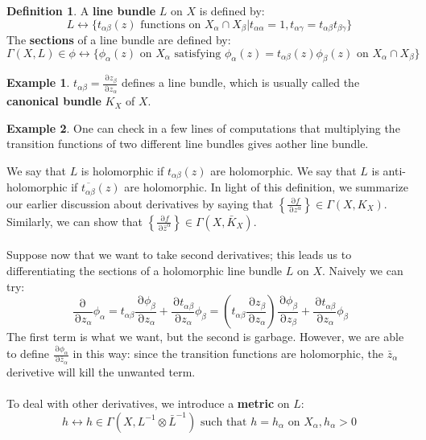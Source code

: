 \documentclass[12 pt]{article}
\DeclareMathOperator {\p} {\partial}
\theoremstyle{plain}
\theoremstyle{definition}
\newtheorem{defn}{Definition}
\newtheorem{exmp}{Example}
\theoremstyle{remark}
\begin{document}
\begin{defn}
A \textbf{line bundle} $L$ on $X$ is defined by:
\[     L \longleftrightarrow  \{ t_{\alpha \beta} (z)   \text{ functions on } X_{\alpha} \cap X_{\beta} | t_{\alpha \alpha} = 1 , t_{\alpha \gamma} = t_{\alpha \beta} t_{\beta \gamma} \}     \]
The \textbf{sections} of a line bundle are defined by:
\[  \Gamma(X,L) \in \phi \longleftrightarrow \{ \phi_{\alpha}(z) \text{ on } X_{\alpha} \text{ satisfying } \phi_{\alpha}(z) = t_{\alpha \beta}(z) \phi_{\beta}(z) \text{ on } X_{\alpha} \cap X_{\beta}  \}    \]
\end{defn}
\begin{exmp}
$t_{\alpha \beta} = \frac{\p z_{\beta}}{\p z_{\alpha}}$ defines a line bundle, which is usually called the \textbf{canonical bundle} $K_X$ of $X$.
\end{exmp}
\begin{exmp}
One can check in a few lines of computations that multiplying the transition functions of two different line bundles gives aother line bundle.
\end{exmp}
We say that $L$ is holomorphic if $t_{\alpha \beta} (z)$ are holomorphic. We say that $L$ is anti-holomorphic if $\overline{t_{\alpha \beta}} (z)$ are holomorphic. In light of this definition, we summarize our earlier discussion about derivatives by saying that $\left\{ \frac{\p f}{\p z^{\alpha}}  \right\} \in \Gamma(X, K_X)$. Similarly, we can show that $\left\{ \frac{\p f}{\p \bar z^{\alpha}}  \right\} \in \Gamma(X, \bar K_X)$.
\\
\\
Suppose now that we want to take second derivatives; this leads us to differentiating the sections of a holomorphic line bundle $L$ on $X$. Naively we can try:
\[     \frac{\p }{\p z_{\alpha}} \phi_{\alpha}  = t_{\alpha \beta} \frac{\p \phi_{\beta}}{\p z_{\alpha}}  + \frac{\p t_{\alpha \beta}}{\p z_{\alpha}} \phi_{\beta}  = \left( t_{\alpha \beta}  \frac{\p z_{\beta}}{\p z_{\alpha}} \right)\frac{\p \phi_{\beta}}{\p z_{\beta}}  + \frac{\p t_{\alpha \beta}}{\p z_{\alpha}} \phi_{\beta}  \]
The first term is what we want, but the second is garbage. However, we are able to define $\frac{\p \phi_{\alpha}}{\p \bar z_{\alpha}}$ in this way: since the transition functions are holomorphic, the $\bar z_{\alpha}$ derivetive will kill the unwanted term.
\\
\\
To deal with other derivatives, we introduce a \textbf{metric} on $L$:
\[     h \longleftrightarrow   h\in \Gamma(X, L^{-1} \otimes \bar L^{-1} ) \text{ such that } h = h_{\alpha} \text{ on } X_{\alpha}, h_{\alpha} >0    \]
\end{document}
